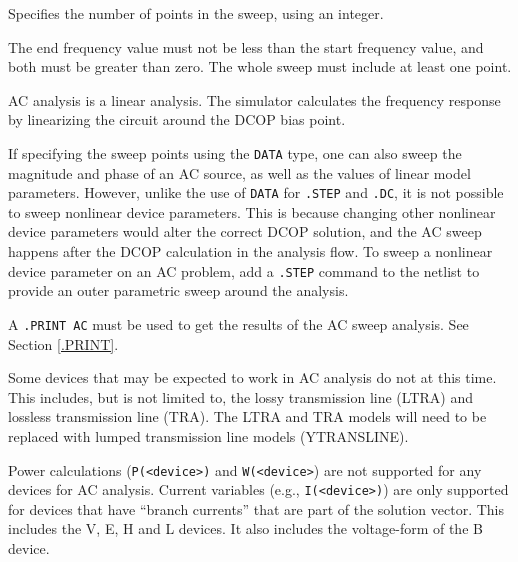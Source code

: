 \begin{Command}
\begin{Arguments}
\begin{description}
\end{description}

Specifies the number of points in the sweep, using an integer.


The end frequency value must not be less than the start frequency value,
and both must be greater than zero. The whole sweep must include at
least one point.

\end{Arguments}

\comments

AC analysis is a linear analysis. The simulator calculates the frequency
response by linearizing the circuit around the DCOP bias point.

If specifying the sweep points using the \texttt{DATA} type, one can
also sweep the magnitude and phase of an AC source, as well as the
values of linear model parameters.  However, unlike the use of
\texttt{DATA} for \texttt{.STEP} and \texttt{.DC}, it is not possible
to sweep nonlinear device parameters.  This is because changing other
nonlinear device parameters would alter the correct DCOP solution, and
the AC sweep happens after the DCOP calculation in the analysis flow.
To sweep a nonlinear device parameter on an AC problem, add a
\texttt{.STEP} command to the netlist to provide an outer parametric
sweep around the analysis.

A \texttt{.PRINT AC} must be used to get the results of the AC sweep
analysis.  See Section \ref{.PRINT}.

Some devices that may be expected to work in AC analysis do not at
this time.  This includes, but is not limited to, the lossy
transmission line (LTRA) and lossless transmission line (TRA).  The
LTRA and TRA models will need to be replaced with lumped transmission
line models (YTRANSLINE).

Power calculations (\texttt{P(<device>)} and \texttt{W(<device>}) are
not supported for any devices for AC analysis.  Current variables
(e.g., \texttt{I(<device>)}) are only supported for devices that have
``branch currents'' that are part of the solution vector. This
includes the V, E, H and L devices.  It also includes the voltage-form
of the B device.

\end{Command}
